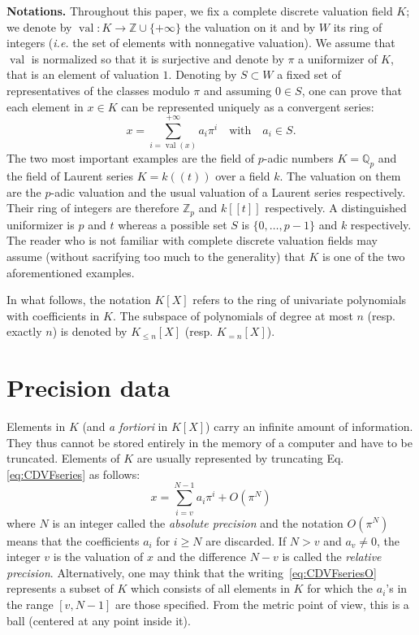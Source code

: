 \documentclass{sig-alternate-05-2015}
\DeclareMathOperator{\val}{val}
\newcommand{\Z}{\mathbb Z}
\newcommand{\Zp}{\Z_p}
\newcommand{\Q}{\mathbb Q}
\newcommand{\Qp}{\Q_p}
\begin{document}
\medskip

\noindent
{\bf Notations.}
Throughout this paper, we fix a complete discrete valuation field $K$; 
we denote by $\val : K \to \Z \cup \{+\infty\}$ the valuation on it and 
by $W$ its ring of integers (\emph{i.e.} the set of elements with 
nonnegative valuation). We assume that $\val$ is normalized so that it
is surjective and denote by $\pi$ a uniformizer of $K$, that is an 
element of valuation $1$. Denoting by $S \subset W$ a fixed set of 
representatives of the classes modulo $\pi$ and assuming $0 \in S$, 
one can prove that each element in $x \in K$ can be represented 
uniquely as a convergent series:
\begin{equation}
\label{eq:CDVFseries}
x = \sum_{i=\val(x)}^{+\infty} a_i \pi^i
\quad \text{with} \quad a_i \in S.
\end{equation}
The two most important examples are the field of $p$-adic numbers $K = 
\Qp$ and the field of Laurent series $K = k((t))$ over a field $k$. The 
valuation on them are the $p$-adic valuation and the usual valuation of 
a Laurent series respectively. Their ring of integers are therefore 
$\Zp$ and $k[[t]]$ respectively. A distinguished uniformizer is $p$ 
and $t$ whereas a possible set $S$ is $\{0, \ldots, p-1\}$ and $k$
respectively.
The reader who is not familiar with complete discrete valuation fields
may assume (without sacrifying too much to the generality) that $K$ is
one of the two aforementioned examples.

In what follows, the notation $K[X]$ refers to the ring of univariate 
polynomials with coefficients in $K$. The subspace of polynomials of 
degree at most $n$ (resp. exactly $n$) is denoted by $K_{\leq n}[X]$ 
(resp. $K_{=n}[X]$).

\section{Precision data} \label{sec:prec_data}

Elements in $K$ (and \emph{a fortiori} in $K[X]$) carry an infinite 
amount of information. They thus cannot be stored entirely in the
memory of a computer and have to be truncated. Elements of $K$ are
usually represented by truncating Eq.\eqref{eq:CDVFseries} as
follows:
\begin{equation}
\label{eq:CDVFseriesO}
x = \sum_{i=v}^{N-1} a_i \pi^i + O(\pi^N)
\end{equation}
where $N$ is an integer called the \emph{absolute precision} and 
the notation $O(\pi^N)$ means that the coefficients $a_i$ for $i
\geq N$ are discarded. If $N > v$ and $a_v \neq 0$, the integer $v$ 
is the valuation of $x$ and the difference $N-v$ is called the
\emph{relative precision}.
Alternatively, one may think that the writing~\eqref{eq:CDVFseriesO}
represents a subset of $K$ which consists of all elements in $K$ for
which the $a_i$'s in the range $[v,N-1]$ are those specified. From the
metric point of view, this is a ball (centered at any point inside it).
\end{document}

